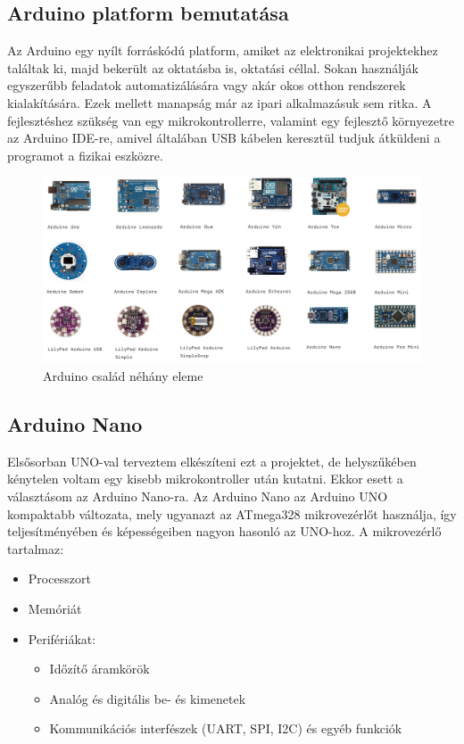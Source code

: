 \documentclass[]{thesis-ekf}
\theoremstyle{definition}
\theoremstyle{remark}
\begin{document}
	\subsection{Arduino platform bemutatása}
	Az Arduino\cite{arduino}\cite{whatisanarduino} egy nyílt forráskódú platform, amiket az elektronikai projektekhez találtak ki, majd bekerült az oktatásba is, oktatási céllal. Sokan használják egyszerűbb feladatok automatizálására vagy akár okos otthon rendszerek kialakítására. Ezek mellett manapság már az ipari alkalmazásuk sem ritka. A fejlesztéshez szükség van egy mikrokontrollerre, valamint egy fejlesztő környezetre az Arduino IDE-re, amivel általában USB kábelen keresztül tudjuk átküldeni a programot a fizikai eszközre.
	\begin{figure}[th!]
		\centering
		\includegraphics[width=0.9\linewidth]{ArduinoFamily}
		\caption[Arduino család néhány fajtája]{Arduino család néhány eleme}
		\label{fig-arduinofamily}
	\end{figure}
	\subsection{Arduino Nano}
	Elsősorban UNO-val\cite{arduinouno} terveztem elkészíteni ezt a projektet, de helyszűkében kénytelen voltam egy kisebb mikrokontroller után kutatni. Ekkor esett a választásom az Arduino Nano-ra\cite{arduinonano}. Az Arduino Nano az Arduino UNO kompaktabb változata, mely ugyanazt az ATmega328 mikrovezérlőt használja, így teljesítményében és képességeiben nagyon hasonló az UNO-hoz. A mikrovezérlő tartalmaz:
	\begin{itemize}
		\item Processzort
		\item Memóriát
		\item Perifériákat:
		\begin{itemize}
			\item Időzítő áramkörök
			\item Analóg és digitális be- és kimenetek
			\item Kommunikációs interfészek (UART, SPI, I2C) és egyéb funkciók
		\end{itemize}
	\end{itemize}
	
\end{document}
